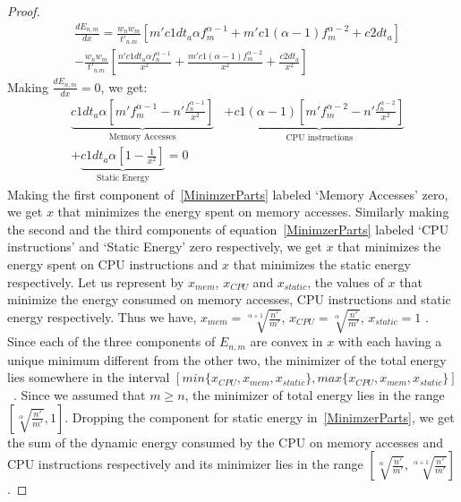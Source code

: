 \documentclass[11pt, letterpaper]{article}
\begin{document}
\begin{proof}
\begin{displaymath}
\begin{aligned}
& \frac{dE_{n,m}}{dx} = \frac{w_nw_m}{t'_{n.m}}[m'c1dt_a\alpha f_m^{\alpha -1} + m'c1(\alpha-1)f_m^{\alpha-2} + c2dt_a]\\
& -\frac{w_nw_m}{t'_{n.m}}[\frac{n'c1dt_a\alpha f_n^{\alpha -1}}{x^2} + \frac{m'c1(\alpha-1)f_m^{\alpha-2}}{x^2} + \frac{c2dt_a}{x^2}]
 \end{aligned}
\end{displaymath}
Making $\frac{dE_{n,m}}{dx} = 0$, we get:
\begin{equation}\label{MinimzerParts}
\begin{aligned}
&\underbrace{c1dt_a\alpha [m'f_m^{\alpha-1} - n'\frac{f_n^{\alpha-1}}{x^2}]}_\text{Memory Accesses}
&+\underbrace{c1(\alpha-1)[m'f_m^{\alpha -2} -n'\frac{f_n^{\alpha-2}}{x^2}]}_\text{CPU instructions}\\
&+\underbrace{c1dt_a\alpha[1-\frac{1}{x^2}]}_\text{Static Energy} = 0
 \end{aligned}
\end{equation}
Making the first component of~\ref{MinimzerParts} labeled `Memory Accesses' zero, we get $x$ that minimizes the energy spent on memory accesses. Similarly making the  second and the third components of equation~\ref{MinimzerParts} labeled `CPU instructions' and `Static Energy' zero respectively, we get $x$ that minimizes the energy spent on CPU instructions and $x$ that minimizes the static energy respectively.
Let us represent by $x_{mem}$, $x_{CPU}$ and $x_{static}$, the values of $x$ that minimize the energy consumed on memory accesses, CPU instructions and static energy respectively.
Thus we have, $x_{mem} = \sqrt[\alpha + 1]{\frac{n'}{m'}}$, $x_{CPU} = \sqrt[\alpha]{\frac{n'}{m'}}$, $x_{static} = 1$ .
Since each of the three components of $E_{n,m}$ are convex in $x$ with each having a unique minimum different from the other two, the minimizer of the total energy lies somewhere in the interval $[min\{x_{CPU}, x_{mem}, x_{static}\}, max\{x_{CPU}, x_{mem}, x_{static}\}]$~\cite{Boyd}. Since we assumed that $m \geq n$, the minimizer of total energy lies in the range $[\sqrt[\alpha]{\frac{n'}{m'}}, 1]$.
Dropping the component for static energy in~\ref{MinimzerParts}, we get the sum of the  dynamic energy consumed by the CPU on memory accesses and CPU instructions respectively and its minimizer lies in the range $[\sqrt[\alpha]{\frac{n'}{m'}}, \sqrt[\alpha + 1]{\frac{n'}{m'}}]$.
\end{proof}
\end{document}
